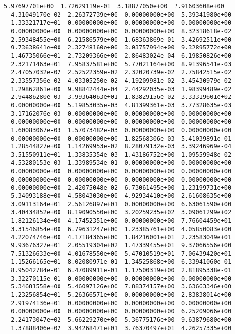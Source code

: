 \documentclass[11pt]{article}
\begin{document}
\begin{Verbatim}[commandchars=\\\{\}]
  5.97697701e+00  1.72629119e-01  3.18877050e+00  7.91603608e+00
  4.31049170e-02  2.26372739e+00  0.00000000e+00  5.39341980e+00
  1.33321717e+01  0.00000000e+00  0.00000000e+00  0.00000000e+00
  0.00000000e+00  0.00000000e+00  0.00000000e+00  8.32318618e-02
  2.59348455e+00  6.21586579e+00  1.68363869e-01  3.42692511e+00
  9.73638641e+00  2.32748160e+00  3.03757994e+00  9.32895772e+00
  1.46735066e+01  2.73209366e+00  2.86483024e-04  6.19850826e+00
  2.32171463e+01  7.95837581e+00  5.77021164e+00  8.91396541e-03
  2.47057032e-02  2.52522359e-02  2.32020739e-02  2.75842515e-02
  2.33557356e-02  4.03305250e-02  4.19209981e-02  3.45430979e-02
  1.29862861e+00  9.98842444e-04  2.44292035e-03  1.98399489e-02
  2.94486280e-03  3.99364063e+01  1.83829156e-02  3.33319601e+02
  0.00000000e+00  5.19853035e-03  4.81399361e-03  3.77328635e-03
  3.17162076e-03  0.00000000e+00  0.00000000e+00  0.00000000e+00
  0.00000000e+00  0.00000000e+00  0.00000000e+00  0.00000000e+00
  1.60083067e-03  1.57073482e-03  0.00000000e+00  0.00000000e+00
  0.00000000e+00  0.00000000e+00  1.82568306e-03  5.41039891e-01
  1.28544827e+00  1.14269953e-02  8.28079132e-03  3.39246969e-04
  3.51550911e+01  1.33835354e-03  1.43186752e+00  1.09559948e-02
  4.53280153e-03  1.33989534e-01  0.00000000e+00  0.00000000e+00
  0.00000000e+00  0.00000000e+00  0.00000000e+00  0.00000000e+00
  0.00000000e+00  0.00000000e+00  0.00000000e+00  0.00000000e+00
  0.00000000e+00  2.42075048e-02  6.73061495e+00  1.23199731e+00
  5.34093188e+00  4.58043030e+00  4.92934410e+00  2.61608635e+00
  3.09113164e+01  2.56126897e+01  0.00000000e+00  6.63061590e+00
  3.40434852e+00  8.19090550e+00  3.20259235e+02  3.09061299e+02
  1.82126134e+00  4.17452351e+00  0.00000000e+00  7.76604459e+01
  3.31546854e+00  6.79631247e+00  1.23385761e+00  4.05850083e+00
  4.22074746e+00  4.17184365e+00  1.84216001e+01  2.23583049e+01
  9.93676327e+01  2.05519304e+02  1.47339455e+01  9.37066556e+00
  7.51326633e+00  4.01678550e+00  5.47010519e+01  7.06439420e+01
  1.15266165e+01  8.02080971e-01  1.34525868e+00  6.33941060e-01
  8.95042784e-01  6.47089911e-01  1.17500319e+00  2.81895338e-01
  3.32270115e-01  0.00000000e+00  0.00000000e+00  0.00000000e+00
  5.34681558e+00  5.46097126e+00  7.88374157e+00  3.63663346e+00
  1.23256854e+01  5.26366571e+00  0.00000000e+00  2.83838014e+00
  2.91974136e+01  0.00000000e+00  0.00000000e+00  0.00000000e+00
  0.00000000e+00  0.00000000e+00  0.00000000e+00  6.25209066e+00
  2.24173047e+02  5.66229270e+00  5.36775176e+00  9.63879680e+00
  1.37888406e+02  3.94268471e+01  3.76370497e+01  4.26257335e+00

\end{Verbatim}
\end{document}
